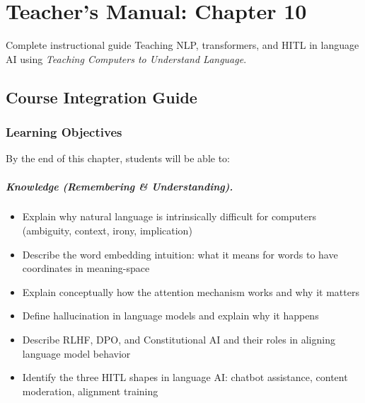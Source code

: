
\chapter{Teacher's Manual: Chapter 10}
\label{ch:teacher-ch10}

\begin{chapterquote}{Complete instructional guide}
Teaching NLP, transformers, and HITL in language AI using \emph{Teaching Computers to Understand Language}.
\end{chapterquote}

\section{Course Integration Guide}

\subsection{Learning Objectives}

By the end of this chapter, students will be able to:

\paragraph{Knowledge (Remembering \& Understanding).}
\begin{itemize}
    \item Explain why natural language is intrinsically difficult for computers (ambiguity, context, irony, implication)
    \item Describe the word embedding intuition: what it means for words to have coordinates in meaning-space
    \item Explain conceptually how the attention mechanism works and why it matters
    \item Define hallucination in language models and explain why it happens
    \item Describe RLHF, DPO, and Constitutional AI and their roles in aligning language model behavior
    \item Identify the three HITL shapes in language AI: chatbot assistance, content moderation, alignment training
\end{itemize}

